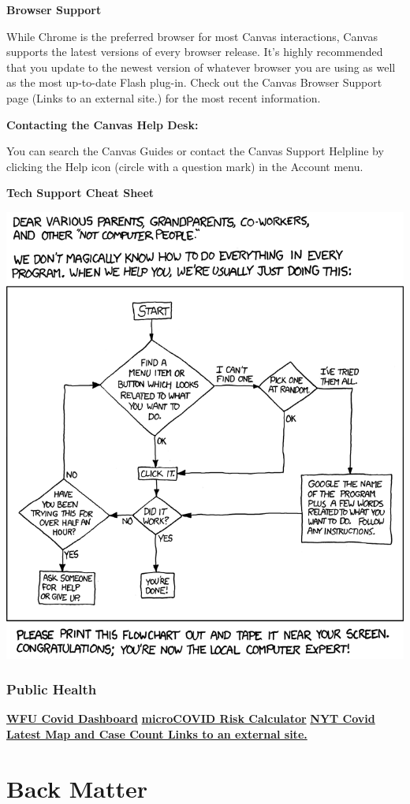 \documentclass[
]{book}
\begin{document}
\textbf{Browser Support}

While Chrome is the preferred browser for most Canvas interactions, Canvas supports the latest versions of every browser release. It's highly recommended that you update to the newest version of whatever browser you are using as well as the most up-to-date Flash plug-in. Check out the Canvas Browser Support page (Links to an external site.) for the most recent information.

\textbf{Contacting the Canvas Help Desk:}

You can search the Canvas Guides or contact the Canvas Support Helpline by clicking the Help icon (circle with a question mark) in the Account menu.

\textbf{Tech Support Cheat Sheet}

\includegraphics[width=10.17in]{img/tech_support_cheat_sheet}

\hypertarget{public-health}{%
\section{Public Health}\label{public-health}}

\textbf{\href{https://ourwayforward.wfu.edu/covid-19-dashboard/}{WFU Covid Dashboard}}
\textbf{\href{https://www.microcovid.org/}{microCOVID Risk Calculator}}
\textbf{\href{https://www.nytimes.com/interactive/2021/us/north-carolina-covid-cases.html}{NYT Covid Latest Map and Case Count Links to an external site.}}

\hypertarget{part-back-matter}{%
\part*{Back Matter}\label{part-back-matter}}

  
\end{document}
